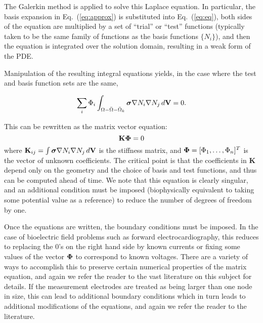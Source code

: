 The Galerkin method is applied to solve this Laplace equation. In
particular, the basis expansion in Eq.~(\ref{eq:approx}) is substituted
into Eq.~(\ref{eq:eq}), both sides of the equation are multiplied by a set
of ``trial'' or ``test'' functions (typically taken to be the same family of
functions as the basis functions $\{N_{i}\}$), and then the equation is
integrated over the solution domain, resulting in a weak form of the
PDE.

Manipulation of the resulting integral equations yields, in the case where
the test and basis function sets are the same,

\begin{equation} \sum_i \Phi_i \int_{\Omega - \bar{\Omega} -
\bar{\Omega}_k} \mbox{\boldmath $\sigma$} \nabla N_i \nabla N_j \, d\mathbf{V} = 0. \label{eq:int_eq}
\end{equation}

This can be rewritten as the matrix vector equation:
\begin{equation} \mathbf{K} \mbox{\boldmath $\Phi$} = 0 \label{eq:mat_eq}
\end{equation}
%
\noindent where $\mathbf{K}_{ij} = \int \mbox{\boldmath $\sigma$} \nabla N_i \nabla N_j \,
d\mathbf{V}$ is the stiffness matrix, and $\mbox{\boldmath $\Phi$} = [\Phi_1,
\ldots, \Phi_n]^T$ is the vector of unknown coefficients. The critical
point is that the coefficients in $\mathbf{K}$ depend only on the geometry
and the choice of basis and test functions, and thus can be computed ahead
of time. We note that this equation is clearly singular, and an additional
condition must be imposed (biophysically equivalent to taking some
potential value as a reference) to reduce the number of degrees of freedom
by one.

Once the equations are written, the boundary conditions must be imposed. In
the case of bioelectric field problems such as forward electrocardiography,
this reduces to replacing the $0$'s on the right hand side by known
currents or fixing some values of the vector $\mbox{\boldmath $\Phi$}$ to correspond to
known voltages. There are a variety of ways to accomplish this to preserve
certain numerical properties of the matrix equation, and again we refer the
reader to the vast literature on this subject for details. If the
measurement electrodes are treated as being larger than one node in size,
this can lead to additional boundary conditions which in turn leads to
additional modifications of the equations, and again we refer the reader to
the literature.


